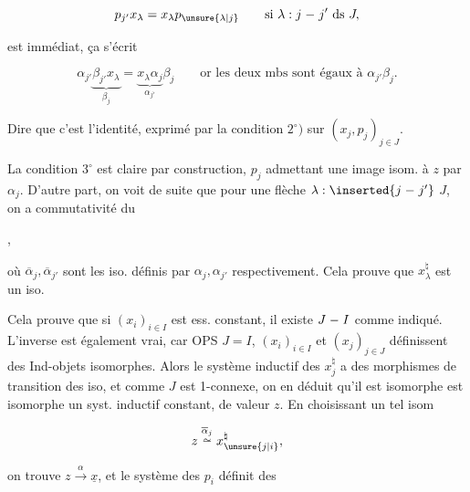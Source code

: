 \[p_{j'}x_\lambda=x_\lambda p_{\unsure{\lambda|j}}\qquad\text{si }\lambda:j\mathrel{\relbar}j'\text{ ds }J,\]

est immédiat, ça s'écrit

\[\alpha_{j'}\underbrace{\beta_{j'}x_\lambda}_{\beta_j}=\underbrace{x_\lambda\alpha_j}_{\alpha_{j'}}\beta_j\qquad\text{or les deux mbs sont égaux à }\alpha_{j'}\beta_j.\]

Dire que c'est l'identité,   exprimé par la condition $2^\circ)$ sur $(x_j,p_j)_{j\in J}$.

La condition $3^\circ$ est claire par construction, $p_j$ admettant une image isom. à $z$ par $\alpha_j$. D'autre part, on voit de suite que pour une flèche $\lambda:\inserted{j\mathrel{\relbar}j'}$  $J$, on a commutativité du

,

où $\overline\alpha_j,\overline\alpha_{j'}$ sont les iso. définis par $\alpha_j,\alpha_{j'}$ respectivement. Cela prouve que $x_\lambda^\natural$ est un iso.

Cela prouve que si $(x_i)_{i\in I}$ est ess. constant, il existe $J\mathrel{\relbar} I$ comme indiqué. L'inverse est également vrai, car OPS $J=I$,  $(x_i)_{i\in I}$ et $(x_j)_{j\in J}$ définissent des Ind-objets isomorphes. Alors le système inductif des $x_j^\natural$ a des morphismes de transition des iso, et comme $J$ est  1-connexe, on en déduit  qu'il est isomorphe
%
%
est isomorphe  un syst. inductif constant, de valeur $z$. En choisissant un tel isom

\[z\mathrel{\overset{\overline\alpha_j}{\overset{\sim}{\relbar}}}x_{\unsure{j|i}}^\natural,\]

on trouve $z\xrightarrow{\alpha}\underline{x}$, et le système des $p_i$ définit des

